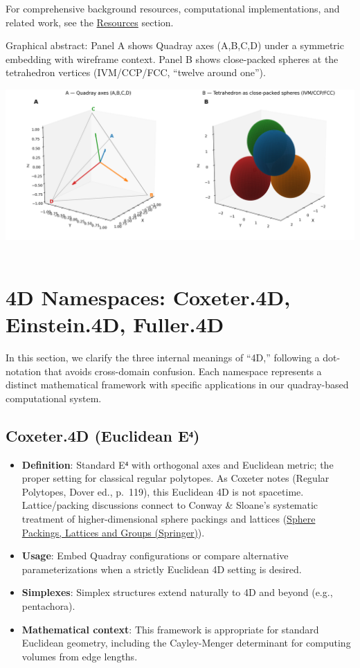 \documentclass[
  10pt,
]{article}
\providecommand{\tightlist}{%
  \setlength{\itemsep}{0pt}\setlength{\parskip}{0pt}}
\begin{document}
For comprehensive background resources, computational implementations,
and related work, see the \href{07_resources.md}{Resources} section.

Graphical abstract: Panel A shows Quadray axes (A,B,C,D) under a
symmetric embedding with wireframe context. Panel B shows close-packed
spheres at the tetrahedron vertices (IVM/CCP/FCC, ``twelve around
one'').

\includegraphics{../output/figures/graphical_abstract_quadray.png} 

\hypertarget{d-namespaces-coxeter.4d-einstein.4d-fuller.4d}{%
\section{4D Namespaces: Coxeter.4D, Einstein.4D,
Fuller.4D}\label{d-namespaces-coxeter.4d-einstein.4d-fuller.4d}}

In this section, we clarify the three internal meanings of ``4D,''
following a dot-notation that avoids cross-domain confusion. Each
namespace represents a distinct mathematical framework with specific
applications in our quadray-based computational system.

\hypertarget{coxeter.4d-euclidean-eux2074}{%
\subsection{Coxeter.4D (Euclidean
E⁴)}\label{coxeter.4d-euclidean-eux2074}}

\begin{itemize}
\tightlist
\item
  \textbf{Definition}: Standard E⁴ with orthogonal axes and Euclidean
  metric; the proper setting for classical regular polytopes. As Coxeter
  notes (Regular Polytopes, Dover ed., p.~119), this Euclidean 4D is not
  spacetime. Lattice/packing discussions connect to Conway \& Sloane's
  systematic treatment of higher-dimensional sphere packings and
  lattices
  (\href{https://link.springer.com/book/10.1007/978-1-4757-6568-7}{Sphere
  Packings, Lattices and Groups (Springer)}).
\item
  \textbf{Usage}: Embed Quadray configurations or compare alternative
  parameterizations when a strictly Euclidean 4D setting is desired.
\item
  \textbf{Simplexes}: Simplex structures extend naturally to 4D and
  beyond (e.g., pentachora).
\item
  \textbf{Mathematical context}: This framework is appropriate for
  standard Euclidean geometry, including the Cayley-Menger determinant
  for computing volumes from edge lengths.
\end{itemize}
\end{document}

